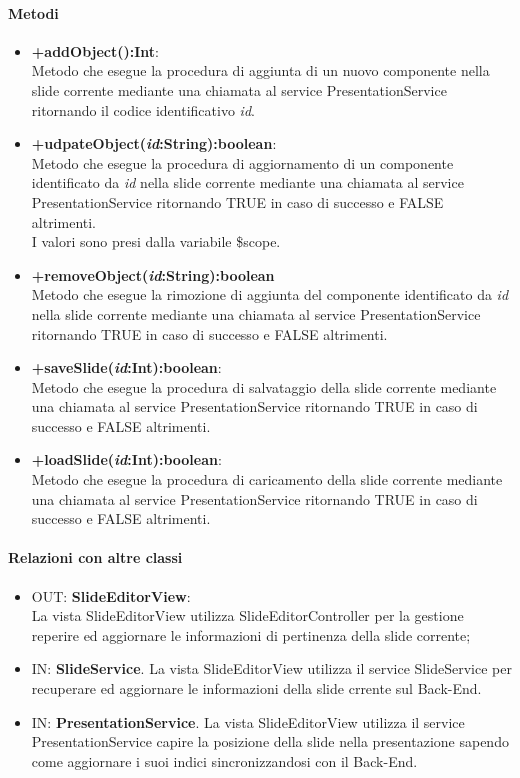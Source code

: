 	\paragraph{Metodi}
	\begin{itemize}
	  \item \textbf{+addObject():Int}:\\
		 Metodo che esegue la procedura di aggiunta di un nuovo componente nella slide corrente mediante una chiamata al service PresentationService ritornando il codice identificativo \textit{id}.
	  \item \textbf{+udpateObject(\textit{id}:String):boolean}:\\
		 Metodo che esegue la procedura di aggiornamento di un componente  identificato da \textit{id} nella slide corrente mediante una chiamata al service PresentationService ritornando TRUE in caso di successo e FALSE altrimenti.\\I valori sono presi dalla variabile \$scope.
	  \item \textbf{+removeObject(\textit{id}:String):boolean}\\
		 Metodo che esegue la rimozione di aggiunta del componente identificato da \textit{id} nella slide corrente mediante una chiamata al service PresentationService ritornando TRUE in caso di successo e FALSE altrimenti.
	  \item \textbf{+saveSlide(\textit{id}:Int):boolean}:\\
		 Metodo che esegue la procedura di salvataggio della slide corrente mediante una chiamata al service PresentationService ritornando TRUE in caso di successo e FALSE altrimenti.
	  \item \textbf{+loadSlide(\textit{id}:Int):boolean}:\\
		 Metodo che esegue la procedura di caricamento della slide corrente mediante una chiamata al service PresentationService ritornando TRUE in caso di successo e FALSE altrimenti.
	  	  
	\end{itemize}
	\paragraph{Relazioni con altre classi}
	\begin{itemize}
	  \item OUT: \textbf{SlideEditorView}:\\
		La vista SlideEditorView utilizza SlideEditorController per la gestione reperire ed aggiornare le informazioni di pertinenza della slide corrente;	
	  \item IN: \textbf{SlideService}.
		La vista SlideEditorView utilizza il service SlideService per recuperare ed aggiornare le informazioni della slide crrente sul Back-End.	
	  \item IN: \textbf{PresentationService}.
		La vista SlideEditorView utilizza il service PresentationService capire la posizione della slide nella presentazione sapendo come aggiornare i suoi indici sincronizzandosi con il Back-End.	
	\end{itemize}		
	
	
